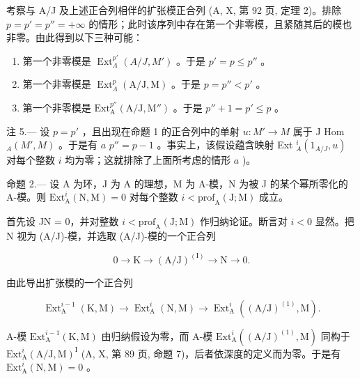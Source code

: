 考察与 A/J 及上述正合列相伴的扩张模正合列 (A, X, 第 92 页, 定理 2)。排除 \(p = p' = p'' = +\infty\) 的情形；此时该序列中存在第一个非零模，且紧随其后的模也非零。由此得到以下三种可能：

\begin{enumerate}
\def\labelenumi{\alph{enumi})}
\item
  第一个非零模是 \(\operatorname{Ext}_{\Lambda}^{p'}(A/J, M')\) 。于是 \(p' = p \leqslant p''\) 。
\item
  第一个非零模是 \(\operatorname{Ext}_{\Lambda}^{p}(\mathrm{A} / \mathrm{J},\mathrm{M})\) 。于是 \(p = p'' < p'\) 。
\item
  第一个非零模是 \(\mathrm{Ext}_{\mathrm{A}}^{p''}(\mathrm{A} / \mathrm{J},\mathrm{M}'')\) 。于是 \(p'' + 1 = p' \leqslant p\) 。
\end{enumerate}

注 5.--- 设 \(p = p'\) ，且出现在命题 1 的正合列中的单射 \(u: M' \to M\) 属于 J Hom \(_A(M', M)\) 。于是有 \(a\) \(p'' = p - 1\) 。事实上，该假设蕴含映射 Ext \(_A^i(1_{A/J}, u)\) 对每个整数 \(i\) 均为零；这就排除了上面所考虑的情形 \(a\) )。

命题 2.--- 设 A 为环，J 为 A 的理想，M 为 A-模，N 为被 J 的某个幂所零化的 A-模。则 \(\mathrm{Ext}_{\mathrm{A}}^{i}(\mathrm{N},\mathrm{M}) = 0\) 对每个整数 \(i < \mathrm{prof}_{\mathrm{A}}(\mathrm{J};\mathrm{M})\) 成立。

首先设 JN = 0，并对整数 \(i < \mathrm{prof}_{\mathrm{A}}(\mathrm{J};\mathrm{M})\) 作归纳论证。断言对 \(i < 0\) 显然。把 N 视为 (A/J)-模，并选取 (A/J)-模的一个正合列

\[
0 \rightarrow \mathrm{K} \longrightarrow (\mathrm{A} / \mathrm{J}) ^ {(\mathrm{I})} \longrightarrow \mathrm{N} \rightarrow 0.
\]

由此导出扩张模的一个正合列

\[
\operatorname{Ext} _ {\mathrm{A}} ^ {i - 1} (\mathrm{K}, \mathrm{M}) \longrightarrow \operatorname{Ext} _ {\mathrm{A}} ^ {i} (\mathrm{N}, \mathrm{M}) \longrightarrow \operatorname{Ext} _ {\mathrm{A}} ^ {i} ((\mathrm{A} / \mathrm{J}) ^ {(1)}, \mathrm{M}).
\]

A-模 \(\mathrm{Ext}_{\mathrm{A}}^{i-1}(\mathrm{K},\mathrm{M})\) 由归纳假设为零，而 A-模 \(\mathrm{Ext}_{\mathrm{A}}^{i}((\mathrm{A}/\mathrm{J})^{(1)},\mathrm{M})\) 同构于 \(\mathrm{Ext}_{\mathrm{A}}^{i}(\mathrm{A}/\mathrm{J},\mathrm{M})^{\mathrm{I}}\) (A, X, 第 89 页, 命题 7)，后者依深度的定义而为零。于是有 \(\mathrm{Ext}_{\mathrm{A}}^{i}(\mathrm{N},\mathrm{M}) = 0\) 。

